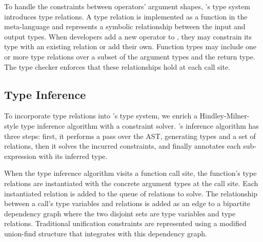 To handle the constraints between operators' argument shapes, \relay's type system
  introduces type relations.
A type relation is implemented as a function in the
  meta-language and represents a symbolic relationship between
  the input and output types.
When developers add a new operator to \relay, they may constrain its
  type with an existing relation or add their own.
Function types may include
  one or more type relations over a subset of the argument types and the return type.
The type checker enforces that these relationships hold at each call site.

\subsection*{Type Inference}
\label{sec:inference}

To incorporate type relations into \relay's type system, we enrich
  a Hindley-Milner-style type inference algorithm with
  a constraint solver.
\relay's inference algorithm has three steps: first, it
  performs a pass over the AST, generating types and a set of relations,
  then it solves the incurred constraints,
  and finally annotates each sub-expression with its inferred type.


When the type inference algorithm visits a function call site, the function's type relations are
  instantiated with the concrete argument types at the call site.
Each instantiated relation is added to the queue of relations to solve.
The relationship between a call's type variables and relations is added as an edge to
  a bipartite dependency graph where the two disjoint sets are type variables and type relations.
Traditional unification constraints are represented using a modified union-find structure that
  integrates with this dependency graph.

